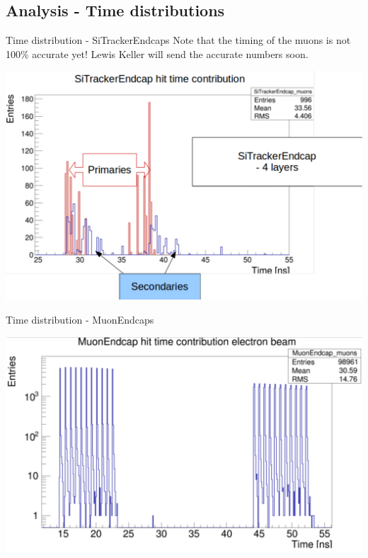 \documentclass[xcolor={dvipsnames}]{beamer}
\begin{document}
\subsection{Analysis - Time distributions}
\begin{frame}{Time distribution - SiTrackerEndcaps}
Note that the timing of the muons is not 100\% accurate yet! Lewis Keller will send the accurate numbers soon.
 \begin{center}
\includegraphics[height=0.78\textheight]{Time_distribution_SiTrackerEndcaps.pdf}
\end{center}
\end{frame}
\begin{frame}{Time distribution - MuonEndcaps}
 \begin{center}
\includegraphics[height=0.78\textheight]{Time_distribution_MuonEndcaps.pdf}
\end{center}
\end{frame}
\end{document}
